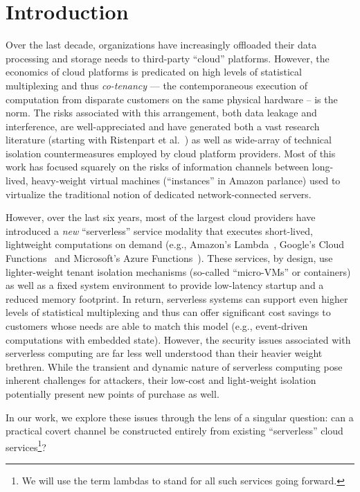 \section{Introduction}
\label{sec:intro}

Over the last decade, organizations have increasingly offloaded their
data processing and storage needs to third-party ``cloud'' platforms.
However, the economics of cloud platforms is predicated on high levels
of statistical multiplexing and thus \emph{co-tenancy} --- the
contemporaneous execution of computation from disparate customers on
the same physical hardware -- is the norm.  The risks associated with
this arrangement, both data leakage and interference, are
well-appreciated and have generated both a vast research literature
(starting with Ristenpart et al.~\cite{ristenpartccs2009}) as well as
wide-array of technical isolation countermeasures employed by cloud
platform providers. Most of this work has focused squarely on the risks
of information channels between long-lived, heavy-weight virtual
machines (``instances'' in Amazon parlance) used to virtualize the
traditional notion of dedicated network-connected servers.

However, over the last six years, most of the largest cloud providers have
introduced a \emph{new} ``serverless'' service modality that executes
short-lived, lightweight computations on demand (e.g., Amazon's
Lambda~\cite{awslambda}, Google's Cloud Functions~\cite{gcpfunctions} and
Microsoft's Azure Functions~\cite{azurefunctions}).  These services, by design,
use lighter-weight tenant isolation mechanisms (so-called ``micro-VMs'' or
containers) as well as a fixed system environment to provide low-latency startup
and a reduced memory footprint.  In return, serverless systems can support even
higher levels of statistical multiplexing and thus can offer significant cost
savings to customers whose needs are able to match this model (e.g.,
event-driven computations with embedded state).  However, the security issues
associated with serverless computing are far less well understood than their
heavier weight brethren. While the transient and dynamic nature of serverless
computing pose inherent challenges for attackers, their low-cost and
light-weight isolation potentially present new points of purchase as well.

In our work, we explore these issues through the lens of a singular question:
can a practical covert channel be constructed entirely from existing
``serverless'' cloud services\footnote{We will use the term lambdas to stand for
all such services going forward.}?

